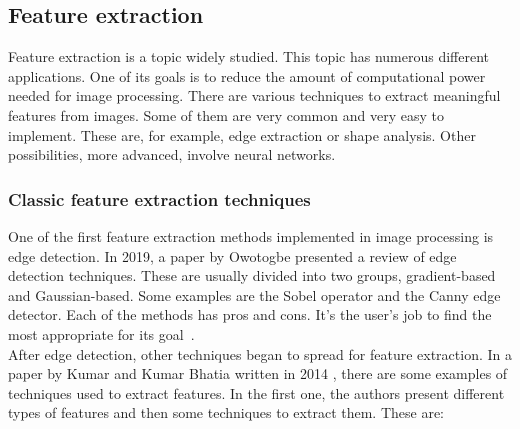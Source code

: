 \documentclass[conference]{IEEEtran}
\begin{document}
	\subsection{Feature extraction}

		Feature extraction is a topic widely studied. 
		This topic has numerous different applications. 
		One of its goals is to reduce the amount of computational power needed for image processing. 
		There are various techniques to extract meaningful features from images. 
		Some of them are very common and very easy to implement. 
		These are, for example, edge extraction or shape analysis. 
		Other possibilities, more advanced, involve neural networks.\\

			\subsubsection{Classic feature extraction techniques}
				
				One of the first feature extraction methods implemented in image processing is edge detection.				
				In 2019, a paper by Owotogbe presented a review of edge detection techniques. 
				These are usually divided into two groups, gradient-based and Gaussian-based. 
				Some examples are the Sobel operator and the Canny edge detector. 
				Each of the methods has pros and cons. 
				It's the user's job to find the most appropriate for its goal~\cite{owotogbe2019edge}.\\
				
				After edge detection, other techniques began to spread for feature extraction. 
				In a paper by Kumar and Kumar Bhatia written in 2014 \cite{kumar2014detailed}, 
				there are some examples of techniques used to extract features. 
				In the first one, the authors present different types of features and then some techniques to extract them. 
				These are:
\end{document}
